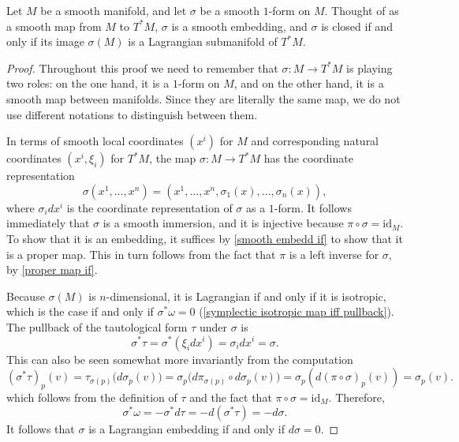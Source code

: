 \begin{proposition}\label{Symplectic manifold one form is embedding to T^*}
Let $M$ be a smooth manifold, and let $\sigma$ be a smooth $1$-form on $M$. Thought of as a smooth map from $M$ to $T^*M$, $\sigma$ is a smooth embedding, and $\sigma$ is closed if and only if its image $\sigma(M)$ is a Lagrangian submanifold of $T^*M$.
\end{proposition}
\begin{proof}
Throughout this proof we need to remember that  $\sigma:M\to T^*M$ is playing two roles: on the one hand, it is a $1$-form on $M$, and on the other hand, it is a smooth map between manifolds. Since they are literally the same map, we do not use different notations to distinguish between them.\par
In terms of smooth local coordinates $(x^i)$ for $M$ and corresponding natural coordinates $(x^i,\xi_i)$ for $T^*M$, the map $\sigma:M\to T^*M$ has the coordinate representation
\[\sigma(x^1,\dots,x^n)=(x^1,\dots,x^n,\sigma_1(x),\dots,\sigma_n(x)),\]
where $\sigma_idx^i$ is the coordinate representation of $\sigma$ as a $1$-form. It follows immediately that $\sigma$ is a smooth immersion, and it is injective because 
$\pi\circ\sigma=\mathrm{id}_M$. To show that it is an embedding, it suffices by \cref{smooth embedd if} to show that it is a proper map. This in turn follows from the fact that $\pi$ is a left inverse for $\sigma$, by \cref{proper map if}.\par
Because $\sigma(M)$ is $n$-dimensional, it is Lagrangian if and only if it is isotropic, which is the case if and only if  $\sigma^*\omega=0$ (\cref{symplectic isotropic map iff pullback}). The pullback of the tautological form $\tau$ under $\sigma$ is
\[\sigma^*\tau=\sigma^*(\xi_idx^i)=\sigma_idx^i=\sigma.\]
This can also be seen somewhat more invariantly from the computation
\[(\sigma^*\tau)_p(v)=\tau_{\sigma(p)}\big(d\sigma_p(v)\big)=\sigma_p\big(d\pi_{\sigma(p)}\circ d\sigma_p(v)\big)=\sigma_p(d(\pi\circ\sigma)_p(v))=\sigma_p(v).\]
which follows from the definition of $\tau$ and the fact that $\pi\circ\sigma=\mathrm{id}_M$. Therefore,
\[\sigma^*\omega=-\sigma^*d\tau=-d(\sigma^*\tau)=-d\sigma.\]
It follows that $\sigma$ is a Lagrangian embedding if and only if $d\sigma=0$.
\end{proof}

